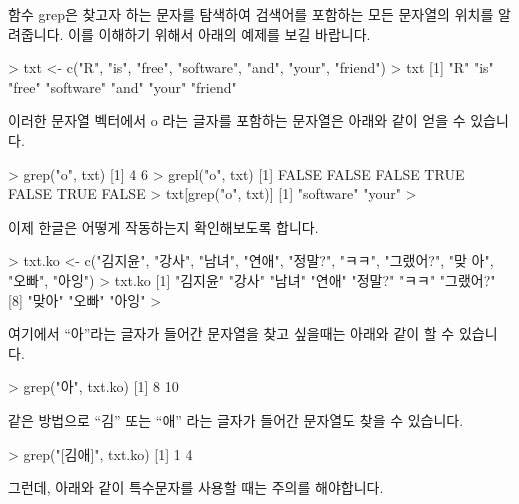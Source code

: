 함수 grep은 찾고자 하는 문자를 탐색하여 검색어를 포함하는 모든 문자열의 위치를 알려줍니다.
이를 이해하기 위해서 아래의 예제를 보길 바랍니다.

\begin{Schunk}
\begin{Soutput} 
> txt <- c("R", "is", "free", "software", "and", "your", "friend")
> txt
[1] "R"        "is"       "free"     "software" "and"      "your"     "friend"  
\end{Soutput}
\end{Schunk}

이러한 문자열 벡터에서 o 라는 글자를 포함하는 문자열은 아래와 같이 얻을 수 있습니다. 

\begin{Schunk}
\begin{Soutput} 
> grep("o", txt)
[1] 4 6
> grepl("o", txt)
[1] FALSE FALSE FALSE  TRUE FALSE  TRUE FALSE
> txt[grep("o", txt)]
[1] "software" "your"    
> 
\end{Soutput}
\end{Schunk}

이제 한글은 어떻게 작동하는지 확인해보도록 합니다. 

\begin{Schunk}
\begin{Soutput} 
> txt.ko <- c("김지윤", "강사", "남녀", "연애", "정말?", "ㅋㅋ", "그랬어?", "맞 아", "오빠", "아잉")
> txt.ko
 [1] "김지윤"  "강사"    "남녀"    "연애"    "정말?"   "ㅋㅋ"    "그랬어?"
 [8] "맞아"    "오빠"    "아잉"   
> 
\end{Soutput}
\end{Schunk}

여기에서 ``아''라는 글자가 들어간 문자열을 찾고 싶을때는 아래와 같이 할 수 있습니다. 

\begin{Schunk}
\begin{Soutput} 
> grep("아", txt.ko)
[1]  8 10
\end{Soutput}
\end{Schunk}

같은 방법으로  ``김'' 또는 ``애'' 라는 글자가 들어간 문자열도 찾을 수 있습니다. 

\begin{Schunk}
\begin{Soutput} 
> grep("[김애]", txt.ko)
[1] 1 4
\end{Soutput}
\end{Schunk}

그런데, 아래와 같이 특수문자를 사용할 때는 주의를 해야합니다. 


